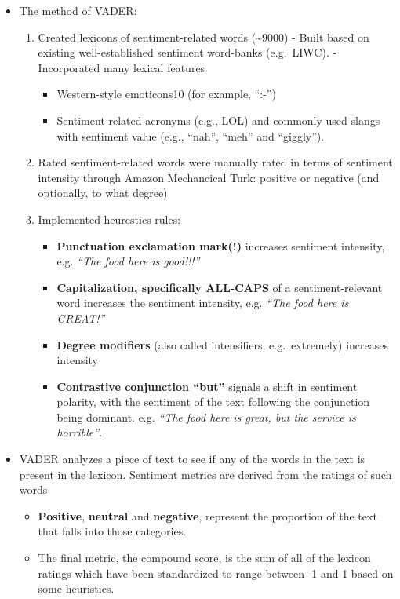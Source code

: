 \documentclass[11pt]{article}
\providecommand{\tightlist}{%
      \setlength{\itemsep}{0pt}\setlength{\parskip}{0pt}}
\begin{document}
\begin{itemize}
\tightlist
\item
  The method of VADER:

  \begin{enumerate}
  \def\labelenumi{\arabic{enumi}.}
  \tightlist
  \item
    Created lexicons of sentiment-related words (\textasciitilde{}9000)
    - Built based on existing well-established sentiment word-banks
    (e.g.~LIWC). - Incorporated many lexical features

    \begin{itemize}
    \tightlist
    \item
      Western-style emoticons10 (for example, ``:-'')
    \item
      Sentiment-related acronyms (e.g., LOL) and commonly used slangs
      with sentiment value (e.g., ``nah'', ``meh'' and ``giggly'').
    \end{itemize}
  \item
    Rated sentiment-related words were manually rated in terms of
    sentiment intensity through Amazon Mechancical Turk: positive or
    negative (and optionally, to what degree)
  \item
    Implemented heurestics rules:

    \begin{itemize}
    \tightlist
    \item
      \textbf{Punctuation exclamation mark(!)} increases sentiment
      intensity, e.g. \emph{``The food here is good!!!''}
    \item
      \textbf{Capitalization, specifically ALL-CAPS} of a
      sentiment-relevant word increases the sentiment intensity, e.g.
      \emph{``The food here is GREAT!''}
    \item
      \textbf{Degree modifiers} (also called intensifiers,
      e.g.~extremely) increases intensity
    \item
      \textbf{Contrastive conjunction ``but''} signals a shift in
      sentiment polarity, with the sentiment of the text following the
      conjunction being dominant. e.g. \emph{``The food here is great,
      but the service is horrible''}.
    \end{itemize}
  \end{enumerate}
\item
  VADER analyzes a piece of text to see if any of the words in the text
  is present in the lexicon. Sentiment metrics are derived from the
  ratings of such words

  \begin{itemize}
  \tightlist
  \item
    \textbf{Positive}, \textbf{neutral} and \textbf{negative}, represent
    the proportion of the text that falls into those categories.
  \item
    The final metric, the compound score, is the sum of all of the
    lexicon ratings which have been standardized to range between -1 and
    1 based on some heuristics.
  \end{itemize}
\end{itemize}
\end{document}
